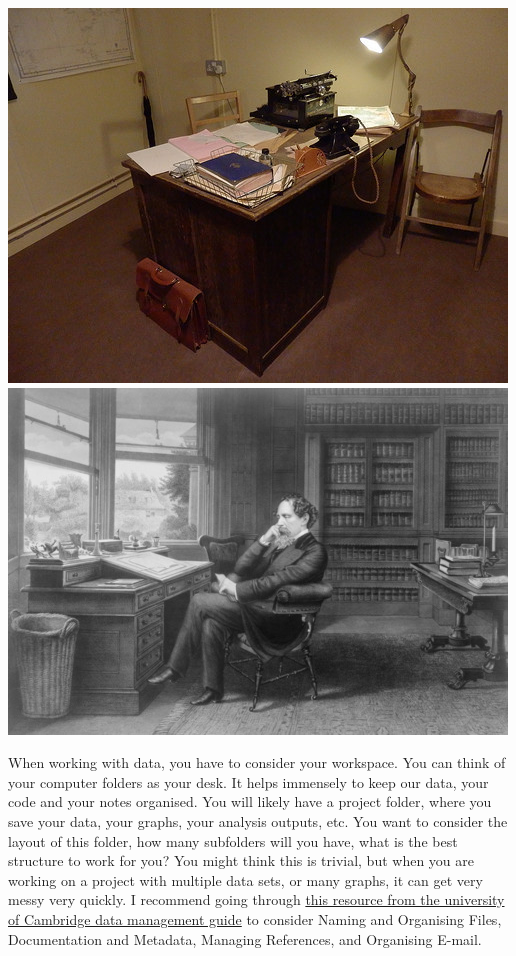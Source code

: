 \documentclass[]{book}
\theoremstyle{definition}
\theoremstyle{definition}
\theoremstyle{definition}
\theoremstyle{remark}
\begin{document}
\includegraphics{imgs/alan_turing_desk.jpg}
\includegraphics{imgs/charles_dickens_desk.jpg}

When working with data, you have to consider your workspace. You can
think of your computer folders as your desk. It helps immensely to keep
our data, your code and your notes organised. You will likely have a
project folder, where you save your data, your graphs, your analysis
outputs, etc. You want to consider the layout of this folder, how many
subfolders will you have, what is the best structure to work for you?
You might think this is trivial, but when you are working on a project
with multiple data sets, or many graphs, it can get very messy very
quickly. I recommend going through
\href{https://www.data.cam.ac.uk/data-management-guide/organising-your-data}{this
resource from the university of Cambridge data management guide} to
consider Naming and Organising Files, Documentation and Metadata,
Managing References, and Organising E-mail.
\end{document}
